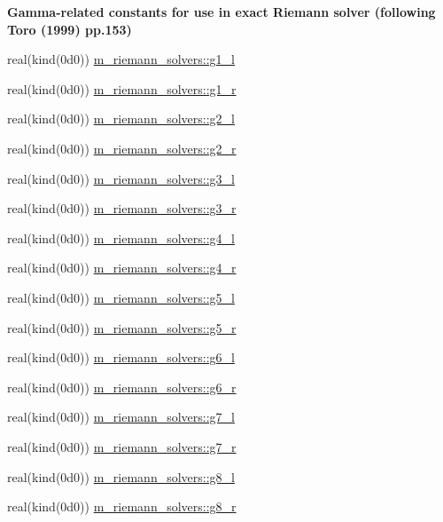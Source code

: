 \begin{Indent}\textbf{ Gamma-\/related constants for use in exact Riemann solver (following Toro (1999) pp.153)}\par
\begin{DoxyCompactItemize}
\item 
real(kind(0d0)) \hyperlink{namespacem__riemann__solvers_adbaf70dfc178970c3e210dddedc31971}{m\+\_\+riemann\+\_\+solvers\+::g1\+\_\+l}
\item 
real(kind(0d0)) \hyperlink{namespacem__riemann__solvers_a44476fe6f5a4cfd8e7bd9b7369a2bfd8}{m\+\_\+riemann\+\_\+solvers\+::g1\+\_\+r}
\item 
real(kind(0d0)) \hyperlink{namespacem__riemann__solvers_a80405eb6d8eaa75206edeef312c782d7}{m\+\_\+riemann\+\_\+solvers\+::g2\+\_\+l}
\item 
real(kind(0d0)) \hyperlink{namespacem__riemann__solvers_a29b168c298a62892312beaf804d88ebd}{m\+\_\+riemann\+\_\+solvers\+::g2\+\_\+r}
\item 
real(kind(0d0)) \hyperlink{namespacem__riemann__solvers_ac58b25fbd4733d5adff39c28b32673b8}{m\+\_\+riemann\+\_\+solvers\+::g3\+\_\+l}
\item 
real(kind(0d0)) \hyperlink{namespacem__riemann__solvers_a1e94f6d0053552684cebcc569b1a6f8a}{m\+\_\+riemann\+\_\+solvers\+::g3\+\_\+r}
\item 
real(kind(0d0)) \hyperlink{namespacem__riemann__solvers_ac44a4218c43a64bbe1b4d0dadc4726f1}{m\+\_\+riemann\+\_\+solvers\+::g4\+\_\+l}
\item 
real(kind(0d0)) \hyperlink{namespacem__riemann__solvers_adb408aa0458d5f80528aff6fa2d7eeb1}{m\+\_\+riemann\+\_\+solvers\+::g4\+\_\+r}
\item 
real(kind(0d0)) \hyperlink{namespacem__riemann__solvers_af4a82bacd4c2232f466428d41f34dffa}{m\+\_\+riemann\+\_\+solvers\+::g5\+\_\+l}
\item 
real(kind(0d0)) \hyperlink{namespacem__riemann__solvers_a8e9c08866eae6dd81d694a5685306973}{m\+\_\+riemann\+\_\+solvers\+::g5\+\_\+r}
\item 
real(kind(0d0)) \hyperlink{namespacem__riemann__solvers_aa0c3d3e0ab3821f201308018c8d3e550}{m\+\_\+riemann\+\_\+solvers\+::g6\+\_\+l}
\item 
real(kind(0d0)) \hyperlink{namespacem__riemann__solvers_aff8b1fce6e33a0d7e18fbf87c252f1cd}{m\+\_\+riemann\+\_\+solvers\+::g6\+\_\+r}
\item 
real(kind(0d0)) \hyperlink{namespacem__riemann__solvers_abbed27f1ec9cca777a83635a05fc8525}{m\+\_\+riemann\+\_\+solvers\+::g7\+\_\+l}
\item 
real(kind(0d0)) \hyperlink{namespacem__riemann__solvers_a746eb452c1a5c1db204624afaad5b478}{m\+\_\+riemann\+\_\+solvers\+::g7\+\_\+r}
\item 
real(kind(0d0)) \hyperlink{namespacem__riemann__solvers_a0f213519240daa52e669ecb053edae70}{m\+\_\+riemann\+\_\+solvers\+::g8\+\_\+l}
\item 
real(kind(0d0)) \hyperlink{namespacem__riemann__solvers_a6ece114ee17503f716a99a601c2ba5d1}{m\+\_\+riemann\+\_\+solvers\+::g8\+\_\+r}
\end{DoxyCompactItemize}
\end{Indent}
